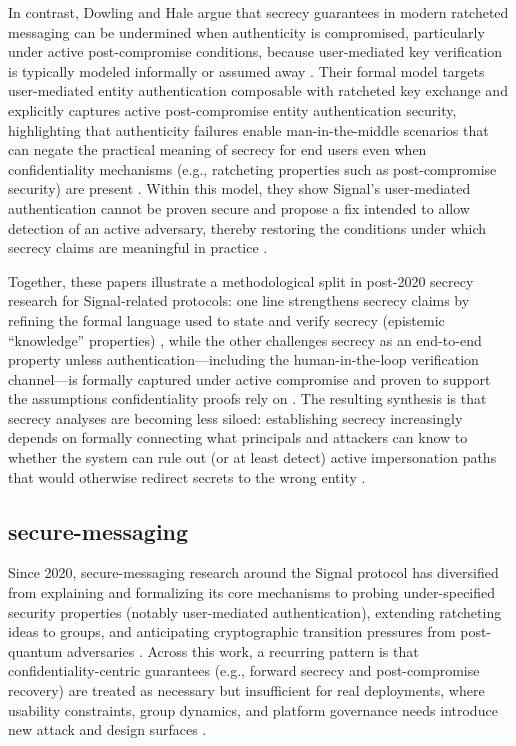 In contrast, Dowling and Hale argue that secrecy guarantees in modern ratcheted messaging can be undermined when authenticity is compromised, particularly under active post-compromise conditions, because user-mediated key verification is typically modeled informally or assumed away \cite{dowling2021}. Their formal model targets user-mediated entity authentication composable with ratcheted key exchange and explicitly captures active post-compromise entity authentication security, highlighting that authenticity failures enable man-in-the-middle scenarios that can negate the practical meaning of secrecy for end users even when confidentiality mechanisms (e.g., ratcheting properties such as post-compromise security) are present \cite{dowling2021}. Within this model, they show Signal’s user-mediated authentication cannot be proven secure and propose a fix intended to allow detection of an active adversary, thereby restoring the conditions under which secrecy claims are meaningful in practice \cite{dowling2021}.

Together, these papers illustrate a methodological split in post-2020 secrecy research for Signal-related protocols: one line strengthens secrecy claims by refining the formal language used to state and verify secrecy (epistemic ``knowledge'' properties) \cite{kamkuemah2021}, while the other challenges secrecy as an end-to-end property unless authentication---including the human-in-the-loop verification channel---is formally captured under active compromise and proven to support the assumptions confidentiality proofs rely on \cite{dowling2021}. The resulting synthesis is that secrecy analyses are becoming less siloed: establishing secrecy increasingly depends on formally connecting what principals and attackers can know to whether the system can rule out (or at least detect) active impersonation paths that would otherwise redirect secrets to the wrong entity \cite{kamkuemah2021,dowling2021}.

\subsection{secure-messaging}

Since 2020, secure-messaging research around the Signal protocol has diversified from explaining and formalizing its core mechanisms to probing under-specified security properties (notably user-mediated authentication), extending ratcheting ideas to groups, and anticipating cryptographic transition pressures from post-quantum adversaries \cite{oppliger2020,vladimirovich2020,dowling2021,oppliger2024,sharma2023,boras2025,ayed2025}. Across this work, a recurring pattern is that confidentiality-centric guarantees (e.g., forward secrecy and post-compromise recovery) are treated as necessary but insufficient for real deployments, where usability constraints, group dynamics, and platform governance needs introduce new attack and design surfaces \cite{dowling2021,oppliger2024,jiang2024,samper2025}.

